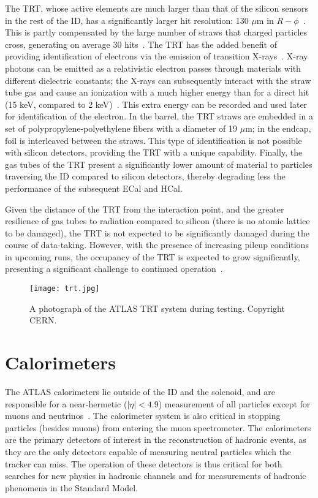 The TRT, whose active elements are much larger than that of the silicon sensors in the rest of the ID, has a significantly larger hit resolution: 130 $\mu$m in $R-\phi$~\cite{ATLASPaper}. This is partly compensated by the large number of straws that charged particles cross, generating on average 30 hits~\cite{ATLASExpected}. The TRT has the added benefit of providing identification of electrons via the emission of transition X-rays~\cite{TRTPID}. X-ray photons can be emitted as a relativistic electron passes through materials with different dielectric constants; the X-rays can subsequently interact with the straw tube gas and cause an ionization with a much higher energy than for a direct hit (15 keV, compared to 2 keV)~\cite{TRTReadout}. This extra energy can be recorded and used later for identification of the electron. In the barrel, the TRT straws are embedded in a set of polypropylene-polyethylene fibers with a diameter of 19 $\mu$m; in the endcap, foil is interleaved between the straws. This type of identification is not possible with silicon detectors, providing the TRT with a unique capability. Finally, the gas tubes of the TRT present a significantly lower amount of material to particles traversing the ID compared to silicon detectors, thereby degrading less the performance of the subsequent ECal and HCal.

Given the distance of the TRT from the interaction point, and the greater resilience of gas tubes to radiation compared to silicon (there is no atomic lattice to be damaged), the TRT is not expected to be significantly damaged during the course of data-taking. However, with the presence of increasing pileup conditions in upcoming runs, the occupancy of the TRT is expected to grow significantly, presenting a significant challenge to continued operation~\cite{TRTOccupancy}.


\begin{figure}
\centering
\texttt{[image: trt.jpg]}
\label{fig:detector:trt}
\caption{A photograph of the ATLAS TRT system during testing. Copyright CERN.}
\end{figure}


\section{Calorimeters}

The ATLAS calorimeters lie outside of the ID and the solenoid, and are responsible for a near-hermetic ($|\eta| < 4.9$) measurement of all particles except for muons and neutrinos~\cite{ATLASPaper}.  The calorimeter system is also critical in stopping particles (besides muons) from entering the muon spectrometer. The calorimeters are the primary detectors of interest in the reconstruction of hadronic events, as they are the only detectors capable of measuring neutral particles which the tracker can miss. The operation of these detectors is thus critical for both searches for new physics in hadronic channels and for measurements of hadronic phenomena in the Standard Model.

